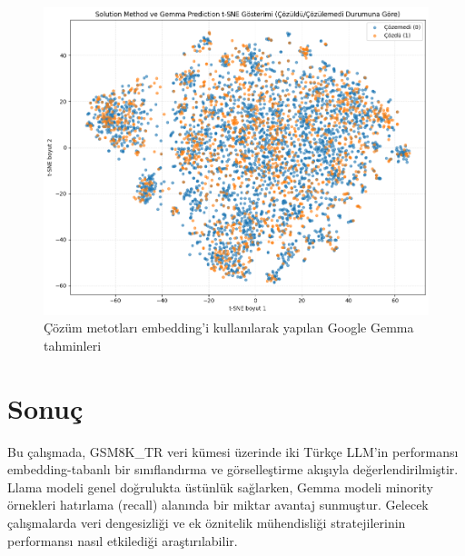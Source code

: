 \documentclass[conference]{IEEEtran}
\begin{document}
\begin{figure}[htbp]
\centering
\includegraphics[width=1\linewidth]{sm-g.png}
\caption{Çözüm metotları embedding'i kullanılarak yapılan Google Gemma tahminleri}
\label{fig}
\end{figure}

\section{Sonuç}
Bu çalışmada, GSM8K\_TR veri kümesi üzerinde iki Türkçe LLM'in performansı embedding-tabanlı bir sınıflandırma ve görselleştirme akışıyla değerlendirilmiştir. Llama modeli genel doğrulukta üstünlük sağlarken, Gemma modeli minority örnekleri hatırlama (recall) alanında bir miktar avantaj sunmuştur. Gelecek çalışmalarda veri dengesizliği ve ek öznitelik mühendisliği stratejilerinin performansı nasıl etkilediği araştırılabilir.
\end{document}
